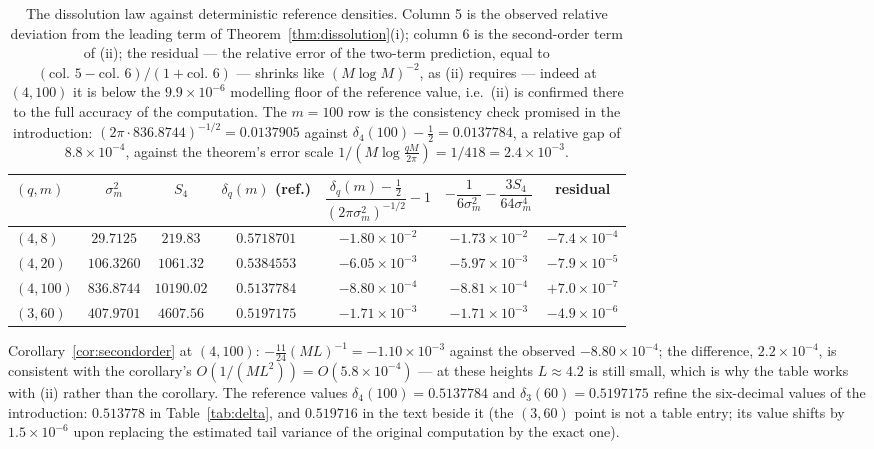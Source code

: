 \begin{remark}
\begin{table}[h]\centering
\begin{tabular}{lcccccc}
\toprule
$(q,m)$ & $\sigma_m^2$ & $S_4$ & $\delta_q(m)$ (ref.) &
$\dfrac{\delta_q(m)-\frac12}{(2\pi\sigma_m^2)^{-1/2}}-1$ &
$-\dfrac1{6\sigma_m^2}-\dfrac{3S_4}{64\sigma_m^4}$ &
residual \\
\midrule
$(4,8)$   & $29.7125$  & $219.83$   & $0.5718701$ & $-1.80\times10^{-2}$ & $-1.73\times10^{-2}$ & $-7.4\times10^{-4}$ \\
$(4,20)$  & $106.3260$ & $1061.32$  & $0.5384553$ & $-6.05\times10^{-3}$ & $-5.97\times10^{-3}$ & $-7.9\times10^{-5}$ \\
$(4,100)$ & $836.8744$ & $10190.02$ & $0.5137784$ & $-8.80\times10^{-4}$ & $-8.81\times10^{-4}$ & $+7.0\times10^{-7}$ \\
$(3,60)$  & $407.9701$ & $4607.56$  & $0.5197175$ & $-1.71\times10^{-3}$ & $-1.71\times10^{-3}$ & $-4.9\times10^{-6}$ \\
\bottomrule
\end{tabular}
\caption{The dissolution law against deterministic reference
densities. Column 5 is the observed relative deviation from the
leading term of Theorem~\ref{thm:dissolution}(i); column 6 is the
second-order term of (ii); the residual --- the relative error of the
two-term prediction, equal to
$(\text{col.~5}-\text{col.~6})/(1+\text{col.~6})$ --- shrinks like
$(M\log M)^{-2}$, as (ii) requires --- indeed at $(4,100)$ it is below
the $9.9\times10^{-6}$ modelling floor of the reference value, i.e.\
(ii) is confirmed there to the full accuracy of the computation. The
$m=100$ row is the consistency check promised in the introduction:
$(2\pi\cdot836.8744)^{-1/2}=0.0137905$ against
$\delta_4(100)-\tfrac12=0.0137784$, a relative gap of
$8.8\times10^{-4}$, against the theorem's error scale
$1/(M\log\tfrac{qM}{2\pi})=1/418=2.4\times10^{-3}$.}
\label{tab:dissolution}
\end{table}

Corollary~\ref{cor:secondorder} at $(4,100)$: $-\tfrac{11}{24}(ML)^{-1}
=-1.10\times10^{-3}$ against the observed $-8.80\times10^{-4}$; the
difference, $2.2\times10^{-4}$, is consistent with the corollary's
$O(1/(ML^2))=O(5.8\times10^{-4})$ --- at these heights $L\approx4.2$
is still small, which is why the table works with (ii) rather than
the corollary. The reference values $\delta_4(100)=0.5137784$ and
$\delta_3(60)=0.5197175$ refine the six-decimal values of the
introduction: $0.513778$ in Table~\ref{tab:delta}, and $0.519716$ in
the text beside it (the $(3,60)$ point is not a table entry; its value
shifts by $1.5\times10^{-6}$ upon replacing the estimated tail
variance of the original computation by the exact one).
\end{remark}

